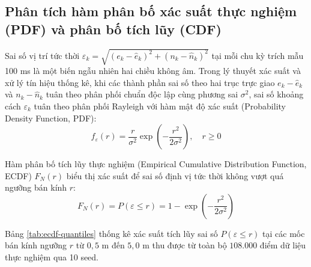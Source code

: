 \subsection{Phân tích hàm phân bố xác suất thực nghiệm (PDF) và phân bố tích lũy (CDF)}

\hspace{0.5cm} Sai số vị trí tức thời $\varepsilon_k = \sqrt{(e_k - \hat{e}_k)^2 + (n_k - \hat{n}_k)^2}$ tại mỗi chu kỳ trích mẫu 100 ms là một biến ngẫu nhiên hai chiều không âm. Trong lý thuyết xác suất và xử lý tín hiệu thống kê, khi các thành phần sai số theo hai trục trực giao $e_k - \hat{e}_k$ và $n_k - \hat{n}_k$ tuân theo phân phối chuẩn độc lập cùng phương sai $\sigma^2$, sai số khoảng cách $\varepsilon_k$ tuân theo phân phối Rayleigh với hàm mật độ xác suất (Probability Density Function, PDF):
\begin{equation}
f_{\varepsilon}(r) = \frac{r}{\sigma^2} \exp\left(-\frac{r^2}{2\sigma^2}\right), \quad r \ge 0
\label{eq:rayleigh-pdf}
\end{equation}

Hàm phân bố tích lũy thực nghiệm (Empirical Cumulative Distribution Function, ECDF) $F_N(r)$ biểu thị xác suất để sai số định vị tức thời không vượt quá ngưỡng bán kính $r$:
\begin{equation}
F_N(r) = P(\varepsilon \le r) = 1 - \exp\left(-\frac{r^2}{2\sigma^2}\right)
\label{eq:ecdf-formula}
\end{equation}

Bảng \ref{tab:ecdf-quantiles} thống kê xác suất tích lũy sai số $P(\varepsilon \le r)$ tại các mốc bán kính ngưỡng $r$ từ $0{,}5$ m đến $5{,}0$ m thu được từ toàn bộ $108.000$ điểm dữ liệu thực nghiệm qua 10 seed.

